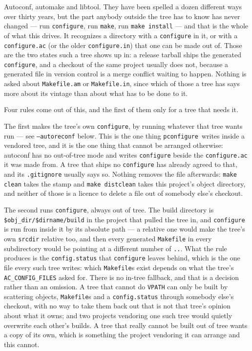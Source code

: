 \documentclass{article}
\newcommand{\pconfigure}{\texttt{pconfigure}}
\begin{document}
Autoconf, automake and libtool.  They have been spelled a dozen
different ways over thirty years, but the part anybody outside the
tree has to know has never changed --- run \texttt{configure}, run
\texttt{make}, run \texttt{make install} --- and that is the whole of
what this drives.  It recognizes a directory with a \texttt{configure}
in it, or with a \texttt{configure.ac} (or the older
\texttt{configure.in}) that one can be made out of.  Those are the two
states such a tree shows up in: a release tarball ships the generated
\texttt{configure}, and a checkout of the same project usually does
not, because a generated file in version control is a merge conflict
waiting to happen.  Nothing is asked about \texttt{Makefile.am} or
\texttt{Makefile.in}, since which of those a tree has says more about
its vintage than about what has to be done to it.

Four rules come out of this, and the first of them only for a tree
that needs it.

The first makes the tree's own \texttt{configure}, by running whatever
that tree wants run --- see \texttt{--autoreconf} below.  This is the
one thing \pconfigure\ writes inside a vendored tree, and it is the
one thing that cannot be arranged otherwise: autoconf has no
out-of-tree mode and writes \texttt{configure} beside the
\texttt{configure.ac} it was made from.  A tree that ships no
\texttt{configure} has already agreed to that, and its
\texttt{.gitignore} usually says so.  Nothing removes the file
afterwards: \texttt{make clean} takes the stamp and \texttt{make
distclean} takes this project's object directory, and neither of those
is a licence to delete a file out of somebody else's checkout.

The second runs \texttt{configure}, always out of tree.  The build
directory is \texttt{\$obj\_dir/\$dirname/build} in the project that
pulled the tree in, and \texttt{configure} is run from inside it by its
absolute path --- a relative one would make the tree's own
\texttt{srcdir} relative too, and then every generated
\texttt{Makefile} in every subdirectory would be pointing at a
different number of \texttt{..}.  What the rule produces is the
\texttt{config.status} that \texttt{configure} leaves behind, which is
the one file every such tree writes: which \texttt{Makefile}s exist
depends on what the tree's \texttt{AC\_CONFIG\_FILES} asked for.
There is no in-tree fallback, and that is a decision rather than an
omission.  A tree that cannot do \texttt{VPATH} can only be built by
scattering objects, \texttt{Makefile}s and a \texttt{config.status}
through somebody else's checkout, with no way to take them back out
that is not that tree's opinion about what it owns; and two projects
vendoring one such tree would quietly overwrite each other's builds.
A tree that really cannot be built out of tree wants a copy of its
own, which is something the project vendoring it can arrange and this
cannot.
\end{document}
